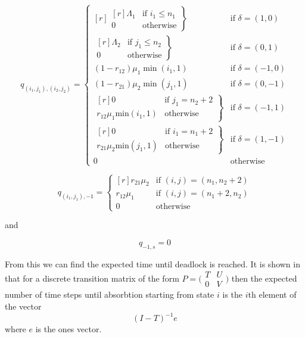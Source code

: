 \documentclass{article}
\begin{document}
\begin{equation}
  q_{(i_1, j_1),(i_2, j_2)} = \left\{
  \begin{matrix*}[ r ]
    \left. \begin{matrix*}[ r ]
      \Lambda_1 & \text{if } i_1 \leq n_1 \\
      0 & \text{otherwise}
    \end{matrix*} \right\} & \text{if } \delta = (1, 0) \\
    \left. \begin{matrix*}[ r ]
      \Lambda_2 & \text{if } j_1 \leq n_2 \\
      0 & \text{otherwise}
    \end{matrix*} \right\} & \text{if } \delta = (0, 1) \\
    (1 - r_{12})\mu_1 \min(i_1, 1) & \text{if } \delta = (-1, 0) \\
    (1 - r_{21})\mu_2 \min(j_1, 1) & \text{if } \delta = (0, -1) \\
    \left. \begin{matrix*}[ r ]
      0 & \text{if } j_1 = n_2 + 2 \\
      r_{12}\mu_1 \text{min}(i_1, 1) & \text{otherwise}
    \end{matrix*} \right\} & \text{if } \delta = (-1, 1) \\
    \left. \begin{matrix*}[ r ]
      0 & \text{if } i_1 = n_1 + 2 \\
      r_{21}\mu_2 \text{min}(j_1, 1) & \text{otherwise}
    \end{matrix*} \right\} & \text{if } \delta = (1, -1) \\
    0 & \text{otherwise}
  \end{matrix*} \right.
\end{equation}

\begin{equation}
  q_{(i_1, j_1), -1} = \left\{
  \begin{matrix*}[ r ]
    r_{21}\mu_2 & \text{if } (i, j) = (n_1, n_2 + 2) \\
    r_{12}\mu_1 & \text{if } (i, j) = (n_1 + 2, n_2) \\
    0 & \text{otherwise}
  \end{matrix*}
  \right.
\end{equation}

and

\begin{equation}
  q_{-1, s} = 0
\end{equation}

From this we can find the expected time until deadlock is reached.
It is shown in \cite{stewart09} that for a discrete transition matrix of the form $P = \bigl(\begin{smallmatrix} T & U\\ 0 & V \end{smallmatrix} \bigr)$ then the expected number of time steps until absorbtion starting from state $i$ is the $i\text{th}$ element of the vector
\begin{equation}
  (I - T)^{-1}e
\end{equation}
where $e$ is the ones vector.




\end{document}
